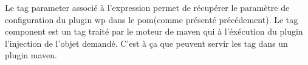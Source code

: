 Le tag parameter associé à l'expression permet de récupérer le paramètre de 
configuration du plugin wp dans le pom(comme présenté précédement). 
Le tag component est un tag traité par le moteur de maven qui à l'éxécution
du plugin l'injection de l'objet demandé. C'est à ça que peuvent servir les 
tag dans un plugin maven. 





